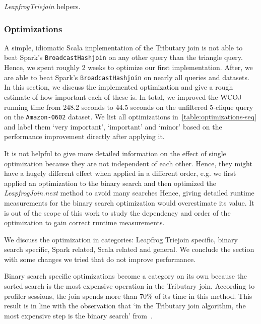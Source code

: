 \begin{listing}[H]
    \inputminted[linenos=true]{scala}{code/LeapfrogTriejoinHelpers.scala}
    \caption{\textit{LeapfrogTriejoin} helpers.}
    \label{lst:leapfrog-triejoin-helpers}
\end{listing}

\subsubsection{Optimizations}
A simple, idiomatic Scala implementation of the Tributary join is not able to beat Spark's \texttt{BroadcastHashjoin} on any other query than the triangle query.
Hence, we spent roughly 2 weeks to optimize our first implementation.
After, we are able to beat Spark's \texttt{BroadcastHashjoin} on nearly all queries and datasets.
In this section, we discuss the implemented optimization and give a rough estimate of how important each of these is.
In total, we improved the WCOJ running time from 248.2 seconds to 44.5 seconds on the unfiltered 5-clique query on the
\texttt{Amazon-0602} dataset.
We list all optimizations in~\cref{table:optimizations-seq} and label them `very important', `important' and `minor' based on the performance improvement directly after applying it.

It is not helpful to give more detailed information on the effect of single optimization because they are not independent of each other.
Hence, they might have a hugely different effect when applied in a different order, e.g. we first applied an optimization to the binary search and then
optimized the \textit{LeapfrogJoin.next} method to avoid many searches
Hence, giving detailed runtime measurements for the binary search optimization would overestimate its value.
It is out of the scope of this work to study the dependency and order of the optimization to gain correct runtime measurements.

We discuss the optimization in categories: Leapfrog Triejoin specific, binary search specific, Spark related, Scala related and general.
We conclude the section with some changes we tried that do not improve performance.

Binary search specific optimizations become a category on its own because the sorted search is the most expensive operation in the Tributary join.
According to profiler sessions, the join spends more than 70\% of its time in this method. %
This result is in line with the observation that `in the Tributary join algorithm, the most expensive step is the binary search' from~\cite{myria-detailed}.

